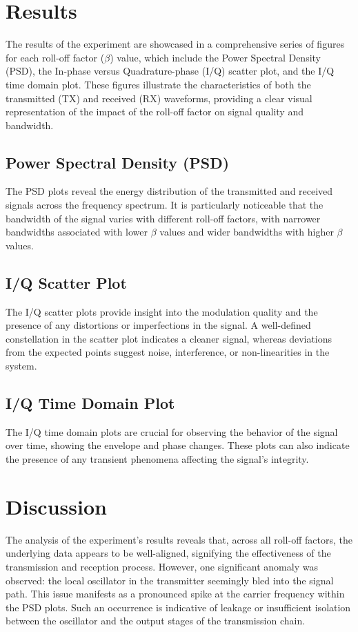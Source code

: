 \documentclass{article}
\begin{document}
\section{Results}
The results of the experiment are showcased in a comprehensive series of figures for each roll-off factor ($\beta$) value, which include the Power Spectral Density (PSD), the In-phase versus Quadrature-phase (I/Q) scatter plot, and the I/Q time domain plot. These figures illustrate the characteristics of both the transmitted (TX) and received (RX) waveforms, providing a clear visual representation of the impact of the roll-off factor on signal quality and bandwidth.

\subsection{Power Spectral Density (PSD)}
The PSD plots reveal the energy distribution of the transmitted and received signals across the frequency spectrum. It is particularly noticeable that the bandwidth of the signal varies with different roll-off factors, with narrower bandwidths associated with lower $\beta$ values and wider bandwidths with higher $\beta$ values.

\subsection{I/Q Scatter Plot}
The I/Q scatter plots provide insight into the modulation quality and the presence of any distortions or imperfections in the signal. A well-defined constellation in the scatter plot indicates a cleaner signal, whereas deviations from the expected points suggest noise, interference, or non-linearities in the system.

\subsection{I/Q Time Domain Plot}
The I/Q time domain plots are crucial for observing the behavior of the signal over time, showing the envelope and phase changes. These plots can also indicate the presence of any transient phenomena affecting the signal's integrity.

\section{Discussion}
The analysis of the experiment's results reveals that, across all roll-off factors, the underlying data appears to be well-aligned, signifying the effectiveness of the transmission and reception process. However, one significant anomaly was observed: the local oscillator in the transmitter seemingly bled into the signal path. This issue manifests as a pronounced spike at the carrier frequency within the PSD plots. Such an occurrence is indicative of leakage or insufficient isolation between the oscillator and the output stages of the transmission chain. 
\end{document}
